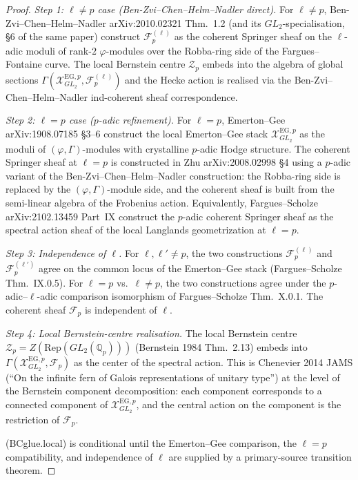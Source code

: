 \begin{proof}
\emph{Step 1: \(\ell\neq p\) case (Ben-Zvi--Chen--Helm--Nadler direct).} For
\(\ell\neq p\), Ben-Zvi--Chen--Helm--Nadler arXiv:2010.02321 Thm.~1.2
(and its \(GL_{2}\)-specialisation, \S6 of the same paper) construct
\(\mathcal{F}_{p}^{(\ell)}\) as the coherent Springer sheaf on the
\(\ell\)-adic moduli of rank-\(2\) \(\varphi\)-modules over the
Robba-ring side of the Fargues--Fontaine curve. The local
Bernstein centre \(\mathcal{Z}_{p}\) embeds into the algebra of
global sections \(\Gamma(\mathcal{X}^{\mathrm{EG},p}_{GL_{2}},\mathcal{F}_{p}^{(\ell)})\)
and the Hecke action is realised via the Ben-Zvi--Chen--Helm--Nadler
ind-coherent sheaf correspondence.

\emph{Step 2: \(\ell=p\) case (\(p\)-adic refinement).} For \(\ell=p\),
Emerton--Gee arXiv:1908.07185 \S3--6 construct the local
Emerton--Gee stack \(\mathcal{X}^{\mathrm{EG},p}_{GL_{2}}\) as the
moduli of \((\varphi,\Gamma)\)-modules with crystalline \(p\)-adic
Hodge structure. The coherent Springer sheaf at \(\ell=p\) is
constructed in Zhu arXiv:2008.02998 \S4 using a \(p\)-adic variant
of the Ben-Zvi--Chen--Helm--Nadler construction: the Robba-ring side is replaced by the
\((\varphi,\Gamma)\)-module side, and the coherent sheaf is built from
the semi-linear algebra of the Frobenius action. Equivalently,
Fargues--Scholze arXiv:2102.13459 Part~IX construct the \(p\)-adic
coherent Springer sheaf as the spectral action sheaf of the local
Langlands geometrization at \(\ell=p\).

\emph{Step 3: Independence of \(\ell\).} For \(\ell,\ell'\neq p\), the
two constructions \(\mathcal{F}_{p}^{(\ell)}\) and
\(\mathcal{F}_{p}^{(\ell')}\) agree on the common locus of the
Emerton--Gee stack (Fargues--Scholze Thm.~IX.0.5). For
\(\ell=p\) vs.\ \(\ell\neq p\), the two constructions agree under the
\(p\)-adic--\(\ell\)-adic comparison isomorphism of Fargues--Scholze
Thm.~X.0.1. The coherent sheaf \(\mathcal{F}_{p}\) is independent
of \(\ell\).

\emph{Step 4: Local Bernstein-centre realisation.} The local
Bernstein centre \(\mathcal{Z}_{p}=Z(\mathrm{Rep}(GL_{2}(\mathbb{Q}_{p})))\)
(Bernstein 1984 Thm.~2.13) embeds into
\(\Gamma(\mathcal{X}^{\mathrm{EG},p}_{GL_{2}},\mathcal{F}_{p})\)
as the center of the spectral action. This is Chenevier 2014 JAMS
(``On the infinite fern of Galois representations of unitary type'')
at the level of the Bernstein component decomposition: each
component corresponds to a connected component of
\(\mathcal{X}^{\mathrm{EG},p}_{GL_{2}}\), and the central action on
the component is the restriction of \(\mathcal{F}_{p}\).

(BCglue.local) is conditional until the Emerton--Gee comparison,
the \(\ell=p\) compatibility, and independence of \(\ell\) are supplied
by a primary-source transition theorem.
\end{proof}

